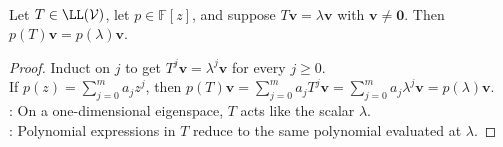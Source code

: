 \begin{proposition} \label{prop:polynomial-eigenvector-evaluation} \\
Let $T\in\LL(\mathcal{V})$, let $p\in\mathbb{F}[z]$, and suppose $T\mathbf{v}=\lambda\mathbf{v}$ with $\mathbf{v}\neq\mathbf{0}$. Then $p(T)\mathbf{v}=p(\lambda)\mathbf{v}$.
\begin{proof}
Induct on $j$ to get $T^j\mathbf{v}=\lambda^j\mathbf{v}$ for every $j\geq0$.\\
If $p(z)=\sum\limits_{j=0}^{m}a_jz^j$, then $p(T)\mathbf{v} =\sum\limits_{j=0}^{m}a_jT^j\mathbf{v} =\sum\limits_{j=0}^{m}a_j\lambda^j\mathbf{v} =p(\lambda)\mathbf{v}$.\\
: On a one-dimensional eigenspace, $T$ acts like the scalar $\lambda$.\\
: Polynomial expressions in $T$ reduce to the same polynomial evaluated at $\lambda$.
\end{proof}
\end{proposition}


